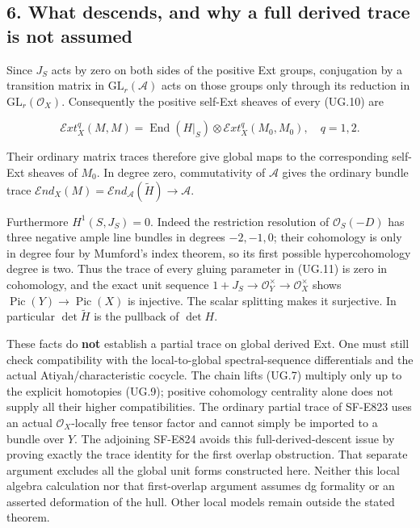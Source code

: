 \subsection{6. What descends, and why a full derived trace is not
assumed}\label{SF-UG-what-descends-and-why-a-full-derived-trace-is-not-assumed}

Since \(J_S\) acts by zero on both sides of the positive Ext groups,
conjugation by a transition matrix in \(\mathrm{GL}_r(\mathcal A)\) acts
on those groups only through its reduction in
\(\mathrm{GL}_r(\mathcal O_X)\). Consequently the positive self-Ext
sheaves of every (UG.10) are

\[
 \mathcal E xt^q_X(M,M)
 =\operatorname{End}(H|_S)\otimes
       \mathcal E xt^q_X(M_0,M_0),\quad q=1,2.
 \tag{UG.14}
\]

Their ordinary matrix traces therefore give global maps to the
corresponding self-Ext sheaves of \(M_0\). In degree zero, commutativity
of \(\mathcal A\) gives the ordinary bundle trace
\(\mathcal E nd_X(M)=\mathcal E nd_{\mathcal A}(\widetilde H)\to\mathcal A\).

Furthermore \(H^1(S,J_S)=0\). Indeed the restriction resolution of
\(\mathcal O_S(-D)\) has three negative ample line bundles in degrees
\(-2,-1,0\); their cohomology is only in degree four by Mumford's index
theorem, so its first possible hypercohomology degree is two. Thus the
trace of every gluing parameter in (UG.11) is zero in cohomology, and
the exact unit sequence
\(1+J_S\to\mathcal O_Y^\times\to\mathcal O_X^\times\) shows
\(\operatorname{Pic}(Y)\to\operatorname{Pic}(X)\) is injective. The
scalar splitting makes it surjective. In particular \(\det\widetilde H\)
is the pullback of \(\det H\).

These facts do \textbf{not} establish a partial trace on global derived
Ext. One must still check compatibility with the local-to-global
spectral-sequence differentials and the actual Atiyah/characteristic
cocycle. The chain lifts (UG.7) multiply only up to the explicit
homotopies (UG.9); positive cohomology centrality alone does not supply
all their higher compatibilities. The ordinary partial trace of SF-E823
uses an actual \(\mathcal O_X\)-locally free tensor factor and cannot
simply be imported to a bundle over \(Y\). The adjoining SF-E824 avoids
this full-derived-descent issue by proving exactly the trace identity
for the first overlap obstruction. That separate argument excludes all
the global unit forms constructed here. Neither this local algebra
calculation nor that first-overlap argument assumes dg formality or an
asserted deformation of the hull. Other local models remain outside the
stated theorem.
